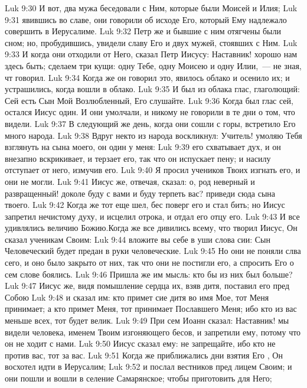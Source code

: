 \vs Luk 9:30 И вот, два мужа беседовали с Ним, которые были Моисей и Илия;
\vs Luk 9:31 явившись во славе, они говорили об исходе Его, который Ему надлежало совершить в Иерусалиме.
\vs Luk 9:32 Петр же и бывшие с ним отягчены были сном; но, пробудившись, увидели славу Его и двух мужей, стоявших с Ним.
\vs Luk 9:33 И когда они отходили от Него, сказал Петр Иисусу: Наставник! хорошо нам здесь быть; сделаем три кущи: одну Тебе, одну Моисею и одну Илии,~--- не зная, чт говорил.
\vs Luk 9:34 Когда же он говорил это, явилось облако и осенило их; и устрашились, когда вошли в облако.
\vs Luk 9:35 И был из облака глас, глаголющий: Сей есть Сын Мой Возлюбленный, Его слушайте.
\vs Luk 9:36 Когда был глас сей, остался Иисус один. И они умолчали, и никому не говорили в те дни о том, что видели.
\rsbpar\vs Luk 9:37 В следующий же день, когда они сошли с горы, встретило Его много народа.
\vs Luk 9:38 Вдруг некто из народа воскликнул: Учитель! умоляю Тебя взглянуть на сына моего, он один у меня:
\vs Luk 9:39 его схватывает дух, и он внезапно вскрикивает, и терзает его, так что он испускает пену; и насилу отступает от него, измучив его.
\vs Luk 9:40 Я просил учеников Твоих изгнать его, и они не могли.
\vs Luk 9:41 Иисус же, отвечая, сказал: о, род неверный и развращенный! доколе буду с вами и буду терпеть вас? приведи сюда сына твоего.
\vs Luk 9:42 Когда же тот еще шел, бес поверг его и стал бить; но Иисус запретил нечистому духу, и исцелил отрока, и отдал его отцу его.
\vs Luk 9:43 И все удивлялись величию Божию.\rsbpar Когда же все дивились всему, что творил Иисус, Он сказал ученикам Своим:
\vs Luk 9:44 вложите вы себе в уши слова сии: Сын Человеческий будет предан в руки человеческие.
\vs Luk 9:45 Но они не поняли слва сего, и оно было закрыто от них, так что они не постигли его, а спросить Его о сем слове боялись.
\vs Luk 9:46 Пришла же им мысль: кто бы из них был больше?
\vs Luk 9:47 Иисус же, видя помышление сердца их, взяв дитя, поставил его пред Собою
\vs Luk 9:48 и сказал им: кто примет сие дитя во имя Мое, тот Меня принимает; а кто примет Меня, тот принимает Пославшего Меня; ибо кто из вас меньше всех, тот будет велик.
\vs Luk 9:49 При сем Иоанн сказал: Наставник! мы видели человека, именем Твоим изгоняющего бесов, и запретили ему, потому что он не ходит с нами.
\vs Luk 9:50 Иисус сказал ему: не запрещайте, ибо кто не против вас, тот за вас.
\rsbpar\vs Luk 9:51 Когда же приближались дни взятия Его , Он восхотел идти в Иерусалим;
\vs Luk 9:52 и послал вестников пред лицем Своим; и они пошли и вошли в селение Самарянское; чтобы приготовить для Него;
